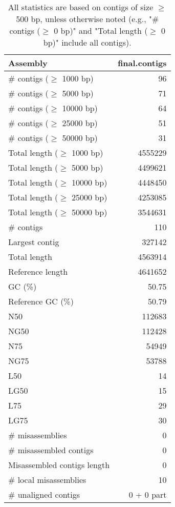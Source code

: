 \documentclass[12pt,a4paper]{article}
\begin{document}
\begin{table}[ht]
\begin{center}
\caption{All statistics are based on contigs of size $\geq$ 500 bp, unless otherwise noted (e.g., "\# contigs ($\geq$ 0 bp)" and "Total length ($\geq$ 0 bp)" include all contigs).}
\begin{tabular}{|l*{1}{|r}|}
\hline
Assembly & final.contigs \\ \hline
\# contigs ($\geq$ 1000 bp) & 96 \\ \hline
\# contigs ($\geq$ 5000 bp) & 71 \\ \hline
\# contigs ($\geq$ 10000 bp) & 64 \\ \hline
\# contigs ($\geq$ 25000 bp) & 51 \\ \hline
\# contigs ($\geq$ 50000 bp) & 31 \\ \hline
Total length ($\geq$ 1000 bp) & 4555229 \\ \hline
Total length ($\geq$ 5000 bp) & 4499621 \\ \hline
Total length ($\geq$ 10000 bp) & 4448450 \\ \hline
Total length ($\geq$ 25000 bp) & 4253085 \\ \hline
Total length ($\geq$ 50000 bp) & 3544631 \\ \hline
\# contigs & 110 \\ \hline
Largest contig & 327142 \\ \hline
Total length & 4563914 \\ \hline
Reference length & 4641652 \\ \hline
GC (\%) & 50.75 \\ \hline
Reference GC (\%) & 50.79 \\ \hline
N50 & 112683 \\ \hline
NG50 & 112428 \\ \hline
N75 & 54949 \\ \hline
NG75 & 53788 \\ \hline
L50 & 14 \\ \hline
LG50 & 15 \\ \hline
L75 & 29 \\ \hline
LG75 & 30 \\ \hline
\# misassemblies & 0 \\ \hline
\# misassembled contigs & 0 \\ \hline
Misassembled contigs length & 0 \\ \hline
\# local misassemblies & 10 \\ \hline
\# unaligned contigs & 0 + 0 part \\ \hline

\end{tabular}
\end{center}
\end{table}
\end{document}
